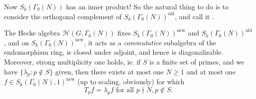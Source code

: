 \documentclass[a4paper]{article}
\begin{document}
Now $S_k(\Gamma_0(N))$ has an inner product! So the natural thing to do is to consider the orthogonal complement of $S_k(\Gamma_0(N))^{\mathrm{old}}$, and call it .

\begin{thm}
  The Hecke algebra $\mathcal{H}(G, \Gamma_0(N))$ fixes $S_k(\Gamma_0(N))^{\mathrm{new}}$ and $S_k(\Gamma_0(N))^{\mathrm{old}}$, and on $S_k(\Gamma_0(N))^{\mathrm{new}}$, it acts as a \emph{commutative} subalgebra of the endomorphism ring, is closed under adjoint, and hence is diagonalizable. Moreover, strong multiplicity one holds, ie. if $S$ is a finite set of primes, and we have $\{\lambda_p: p \not\in S\}$ given, then there exists at most one $N \geq 1$ and at most one $f \in S_k(\Gamma_0(N), 1)^{\mathrm{new}}$ (up to scaling, obviously) for which
  \[
    T_p f = \lambda_p f\text{ for all }p \nmid N, p \not \in S.
  \]
\end{thm}



\printindex
\end{document}
